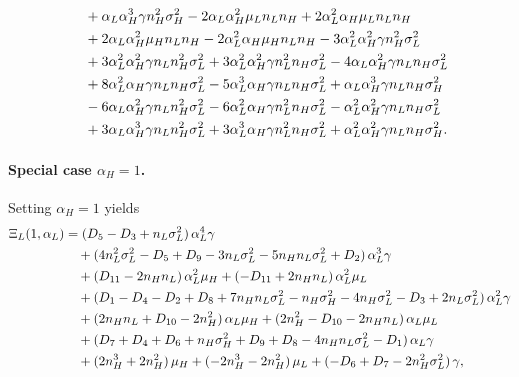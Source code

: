\documentclass[a4paper,12pt]{article}
\theoremstyle{definition}
\theoremstyle{remark}
\newcommand{\1}{\mathbf{1}}
\begin{document}
\begin{align}
    &\quad + \alpha_L \alpha_H^3 \gamma n_H^2 \sigma_H^2 - 2 \alpha_L \alpha_H^2 \mu_L n_L n_H + 2 \alpha_L^2 \alpha_H \mu_L n_L n_H \notag\\
    &\quad + 2 \alpha_L \alpha_H^2 \mu_H n_L n_H - 2 \alpha_L^2 \alpha_H \mu_H n_L n_H - 3 \alpha_L^2 \alpha_H^2 \gamma n_H^2 \sigma_L^2 \notag\\
    &\quad + 3 \alpha_L^2 \alpha_H^2 \gamma n_L n_H^2 \sigma_L^2 + 3 \alpha_L^2 \alpha_H^2 \gamma n_L^2 n_H \sigma_L^2 - 4 \alpha_L \alpha_H^2 \gamma n_L n_H \sigma_L^2 \notag\\
    &\quad + 8 \alpha_L^2 \alpha_H \gamma n_L n_H \sigma_L^2 - 5 \alpha_L^3 \alpha_H \gamma n_L n_H \sigma_L^2 + \alpha_L \alpha_H^3 \gamma n_L n_H \sigma_H^2 \notag\\
    &\quad - 6 \alpha_L \alpha_H^2 \gamma n_L n_H^2 \sigma_L^2 - 6 \alpha_L^2 \alpha_H \gamma n_L^2 n_H \sigma_L^2 - \alpha_L^2 \alpha_H^2 \gamma n_L n_H \sigma_L^2 \notag\\
    &\quad + 3 \alpha_L \alpha_H^3 \gamma n_L n_H^2 \sigma_L^2 + 3 \alpha_L^3 \alpha_H \gamma n_L^2 n_H \sigma_L^2 + \alpha_L^2 \alpha_H^2 \gamma n_L n_H \sigma_H^2. \label{eq:XiL}
\end{align}

\paragraph{Special case $\alpha_H=1$.}
Setting $\alpha_H = 1$ yields
\begin{align}
    \Xi_L(1,\alpha_L)
    &= (D_5 - D_3 + n_L \sigma_L^2)\,\alpha_L^4 \gamma \notag\\
    &\quad + (4 n_L^2 \sigma_L^2 - D_5 + D_9 - 3 n_L \sigma_L^2 - 5 n_H n_L \sigma_L^2 + D_2)\,\alpha_L^3 \gamma \notag\\
    &\quad + (D_{11} - 2 n_H n_L)\,\alpha_L^2 \mu_H + (-D_{11} + 2 n_H n_L)\,\alpha_L^2 \mu_L \notag\\
    &\quad + (D_1 - D_4 - D_2 + D_8 + 7 n_H n_L \sigma_L^2 - n_H \sigma_H^2 - 4 n_H \sigma_L^2 - D_3 + 2 n_L \sigma_L^2)\,\alpha_L^2 \gamma \notag\\
    &\quad + (2 n_H n_L + D_{10} - 2 n_H^2)\,\alpha_L \mu_H + (2 n_H^2 - D_{10} - 2 n_H n_L)\,\alpha_L \mu_L \notag\\
    &\quad + (D_7 + D_4 + D_6 + n_H \sigma_H^2 + D_9 + D_8 - 4 n_H n_L \sigma_L^2 - D_1)\,\alpha_L \gamma \notag\\
    &\quad + (2 n_H^3 + 2 n_H^2)\,\mu_H + (-2 n_H^3 - 2 n_H^2)\,\mu_L + (-D_6 + D_7 - 2 n_H^2 \sigma_L^2)\,\gamma, \label{eq:XiL-special}
\end{align}
\end{document}
